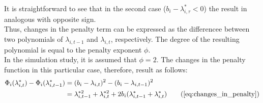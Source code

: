 \documentclass[../main.tex]{subfiles}
\begin{document}
It is straightforward to see that in the second case ($ b_i - \lambda_{i, \tau}^* < 0$) the result in analogous with opposite sign.\\
Thus, changes in the penalty term can be expressed as the differencee between two polynomials of $\lambda_{i,t-1}$ and $\lambda_{i,t}$, respectively. The degree of the resulting polynomial is equal to the penalty exponent $\phi$.\\
In the simulation study, it is assumed that $\phi = 2$. The changes in the penalty function in this particular case, therefore, result as follows:
\begin{align}
	\Phi_{i}(\lambda_{i,t}^*) - \Phi_{i}(\lambda_{i,t-1}^*) &= (b_i - \lambda_{i,t})^2 - (b_i - \lambda_{i,t-1})^2 \nonumber \\
	{} &= \lambda_{i,t-1}^{*2} + \lambda_{i,t}^{*2} + 2b_i(\lambda_{i,t-1}^* + \lambda_{i,t}^*) \tag{\ref{eq:changes_in_penalty}}
\end{align}
\end{document}
